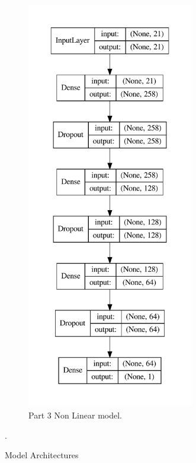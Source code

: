\begin{figure}
{\begin{subfigure}[b]{.6\textwidth}
    \includegraphics[width=0.8\textwidth]{figures/nonlinear_model.pdf}
    \caption{Part 3 Non Linear model.}
    \label{fig:nonlinmodel}
    \end{subfigure}%
}
\caption[Part 3 Linear and Non-linear Network Architectures]{Model Architectures}.
\label{fig:modelarchitectures}
\end{figure}
